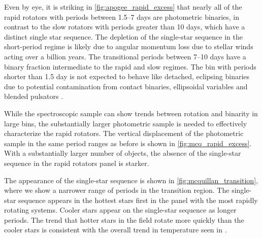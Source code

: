 \documentclass[twocolumn]{aastex6}
\begin{document}
Even by eye, it is striking in \cref{fig:apogee_rapid_excess} that nearly all 
of the rapid rotators with periods between 1.5--7 days are photometric 
binaries, in contrast to the slow rotators with periods greater than 10 days, 
which have a distinct single star sequence.  The depletion of the single-star 
sequence in the short-period regime is likely due to angular momentum loss due 
to stellar winds acting over a billion years. The transitional periods between 
7--10 days have a binary fraction intermediate to the rapid and slow regimes. 
The bin with periods shorter than 1.5 day is not expected to behave like 
detached, eclipsing binaries due to potential contamination from contact 
binaries, ellipsoidal variables and blended pulsators \citep{VanEylen16}. 

\begin{figure*}[htb]
    \centering
    \caption{\emph{Top Left to Bottom Right:} Vertical displacement of all 
        cool \citet{McQuillan14} targets in period ranges >10 days, 
        7-10 days, 1.5-7 days, and <1.5 days. Pink stars 
        denote eclipsing binaries with orbital periods within the same ranges. 
        The green and purple lines denote the inclusive and conservative 
    photometric binary thresholds, respectively. The temperatures are from
\citet{Pinsonneault12}.}\label{fig:mcq_rapid_excess}
\end{figure*}

While the spectroscopic sample can show trends between rotation and binarity in
large bins, the substantially larger photometric sample is needed to 
effectively characterize the rapid rotators. The vertical displacement of the
photometric sample in the same period ranges as before is shown in 
\cref{fig:mcq_rapid_excess}.  With a substantially larger number of objects, the 
absence of the single-star sequence in the rapid rotators panel is starker. 

\begin{figure*}[htb]
    \centering
    \caption{Same as \cref{fig:mcq_rapid_excess} except with the period ranges
    7--9 days, 9--11 days, 11--13 days, and 13--15 days.}
    \label{fig:mcquillan_transition}
\end{figure*}

The appearance of the single-star sequence is shown in
\cref{fig:mcquillan_transition}, where we show a narrower range of
periods in the transition region. The single-star sequence appears in the
hottest stars first in the panel with the most rapidly rotating systems. Cooler
stars appear on the single-star sequence as longer periods. The trend
that hotter stars in the field rotate more quickly than the cooler stars 
is consistent with the overall trend in temperature seen in 
\citet{McQuillan14}.
\end{document}
